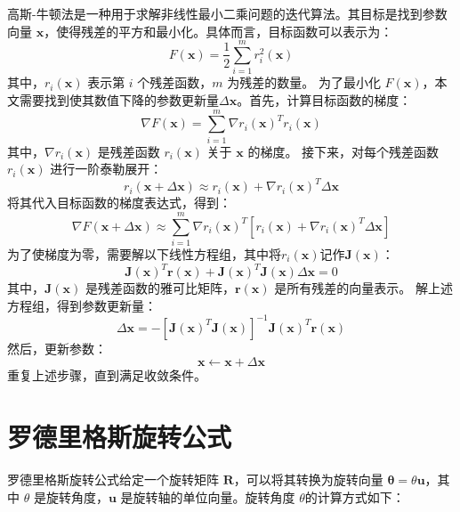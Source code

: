 高斯-牛顿法是一种用于求解非线性最小二乘问题的迭代算法。其目标是找到参数向量 \( \symbf{x} \)，使得残差的平方和最小化。具体而言，目标函数可以表示为：
\begin{equation}
F(\symbf{x}) = \frac{1}{2} \sum_{i=1}^{m} r_i^2(\symbf{x})
\end{equation}
其中，\( r_i(\symbf{x}) \) 表示第 \( i \) 个残差函数，\( m \) 为残差的数量。
为了最小化 \( F(\symbf{x}) \)，本文需要找到使其数值下降的参数更新量$\Delta \symbf{x}$。首先，计算目标函数的梯度：
\begin{equation}
\nabla F(\symbf{x}) = \sum_{i=1}^{m} \nabla r_i(\symbf{x})^{T} r_i(\symbf{x})
\end{equation}
其中，\( \nabla r_i(\symbf{x}) \) 是残差函数 \( r_i(\symbf{x}) \) 关于 \( \symbf{x} \) 的梯度。
接下来，对每个残差函数 \( r_i(\symbf{x}) \) 进行一阶泰勒展开：
\begin{equation}
r_i(\symbf{x} + \Delta \symbf{x}) \approx r_i(\symbf{x}) + \nabla r_i(\symbf{x})^T \Delta \symbf{x}
\end{equation}
将其代入目标函数的梯度表达式，得到：
\begin{equation}
\nabla F(\symbf{x} + \Delta \symbf{x}) \approx \sum_{i=1}^{m} \nabla r_i(\symbf{x})^{T} \left[ r_i(\symbf{x}) + \nabla r_i(\symbf{x})^T \Delta \symbf{x} \right] 
\end{equation}
为了使梯度为零，需要解以下线性方程组，其中将$r_i(\symbf{x})$记作$\symbf{J}(\symbf{x})$：
\begin{equation}
\symbf{J}(\symbf{x})^T \symbf{r}(\symbf{x}) + \symbf{J}(\symbf{x})^T \symbf{J}(\symbf{x}) \Delta \symbf{x} = 0
\end{equation}
其中，\( \symbf{J}(\symbf{x}) \) 是残差函数的雅可比矩阵，\( \symbf{r}(\symbf{x}) \) 是所有残差的向量表示。
解上述方程组，得到参数更新量：
\begin{equation}
\Delta \symbf{x} = -\left[ \symbf{J}(\symbf{x})^T \symbf{J}(\symbf{x}) \right]^{-1} \symbf{J}(\symbf{x})^T \symbf{r}(\symbf{x})
\end{equation}
然后，更新参数：
\begin{equation}
\symbf{x} \leftarrow \symbf{x} + \Delta \symbf{x}
\end{equation}
重复上述步骤，直到满足收敛条件。


\section{罗德里格斯旋转公式}
\label{appendix:rodrigues}
罗德里格斯旋转公式给定一个旋转矩阵 \( \symbf{R} \)，可以将其转换为旋转向量 \( \boldsymbol{\theta} = \theta \symbf{u} \)，其中 \( \theta \) 是旋转角度，\( \symbf{u} \) 是旋转轴的单位向量。旋转角度 \( \theta \)的计算方式如下：

